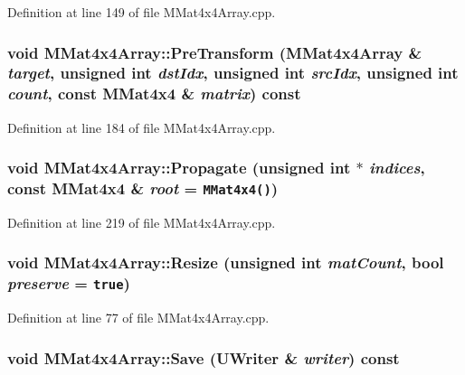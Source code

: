 Definition at line 149 of file MMat4x4Array.cpp.\hypertarget{class_m_mat4x4_array_7e24ecc0ea807c875855e82030039e73}{
\subsubsection[{PreTransform}]{\setlength{\rightskip}{0pt plus 5cm}void MMat4x4Array::PreTransform ({\bf MMat4x4Array} \& {\em target}, \/  unsigned int {\em dstIdx}, \/  unsigned int {\em srcIdx}, \/  unsigned int {\em count}, \/  const {\bf MMat4x4} \& {\em matrix}) const}}
\label{class_m_mat4x4_array_7e24ecc0ea807c875855e82030039e73}




Definition at line 184 of file MMat4x4Array.cpp.\hypertarget{class_m_mat4x4_array_91a049d047232f4298c645ded9e46142}{
\subsubsection[{Propagate}]{\setlength{\rightskip}{0pt plus 5cm}void MMat4x4Array::Propagate (unsigned int $\ast$ {\em indices}, \/  const {\bf MMat4x4} \& {\em root} = {\tt {\bf MMat4x4}()})}}
\label{class_m_mat4x4_array_91a049d047232f4298c645ded9e46142}




Definition at line 219 of file MMat4x4Array.cpp.\hypertarget{class_m_mat4x4_array_aaf1503ef4d6c009cbddf5cc9c881cd5}{
\subsubsection[{Resize}]{\setlength{\rightskip}{0pt plus 5cm}void MMat4x4Array::Resize (unsigned int {\em matCount}, \/  bool {\em preserve} = {\tt true})}}
\label{class_m_mat4x4_array_aaf1503ef4d6c009cbddf5cc9c881cd5}




Definition at line 77 of file MMat4x4Array.cpp.\hypertarget{class_m_mat4x4_array_1f3e7923d51eed94d4d674ba5cc7df7e}{
\subsubsection[{Save}]{\setlength{\rightskip}{0pt plus 5cm}void MMat4x4Array::Save ({\bf UWriter} \& {\em writer}) const}}
\label{class_m_mat4x4_array_1f3e7923d51eed94d4d674ba5cc7df7e}





